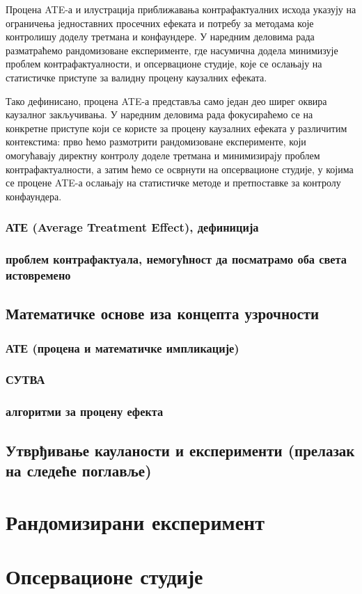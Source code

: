 \documentclass[12pt, a4paper]{article}
\begin{document}
Процена ATE-а и илустрација приближавања контрафактуалних исхода указују на ограничења једноставних просечних ефеката и потребу за методама које контролишу доделу 
третмана и конфаундере. У наредним деловима рада разматраћемо рандомизоване експерименте, где насумична додела минимизује проблем контрафактуалности, и опсервационе 
студије, које се ослањају на статистичке приступе за валидну процену каузалних ефеката.

Тако дефинисано, процена ATE-а представља само један део ширег оквира каузалног закључивања. У наредним деловима рада фокусираћемо се на конкретне приступе који се 
користе за процену каузалних ефеката у различитим контекстима: прво ћемо размотрити рандомизоване експерименте, који омогућавају директну контролу доделе третмана и 
минимизирају проблем контрафактуалности, а затим ћемо се осврнути на опсервационе студије, у којима се процене ATE-а ослањају на статистичке методе и претпоставке за 
контролу конфаундера.

    \subsubsection{АТЕ (Average Treatment Effect), дефиниција}
    \subsubsection{проблем контрафактуала, немогућност да посматрамо оба света истовремено}
\subsection{Математичке основе иза концепта узрочности}
    \subsubsection{АТЕ (процена и математичке импликације)}
    \subsubsection{СУТВА}
    \subsubsection{алгоритми за процену ефекта}
\subsection{Утврђивање кауланости и експерименти (прелазак на следеће поглавље)}

\newpage



\section{Рандомизирани експеримент}
\newpage



\section{Опсервационе студије}
\end{document}
